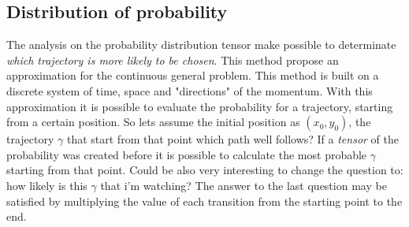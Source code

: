 \documentclass[class=article, crop=false]{standalone}
\begin{document}
\subsection{Distribution of probability}
The analysis on the probability distribution tensor make possible to determinate \emph{which trajectory is more likely to be chosen}.
This method propose an approximation for the continuous general problem.
This method is built on a discrete system of time, space and "directions" of the momentum.
With this approximation it is possible to evaluate the probability for a trajectory, starting from a certain position.
So lets assume the initial position as $(x_0, y_0)$, the trajectory $\gamma$ that start from that point which path well follows?
If a \emph{tensor} of the probability was created before it is possible to calculate the most probable $\gamma$ starting from that point.
Could be also very interesting to change the question to: how likely is this $\gamma$ that i'm watching?
The answer to the last question may be satisfied by multiplying the value of each transition from the starting point to the end.
\end{document}
